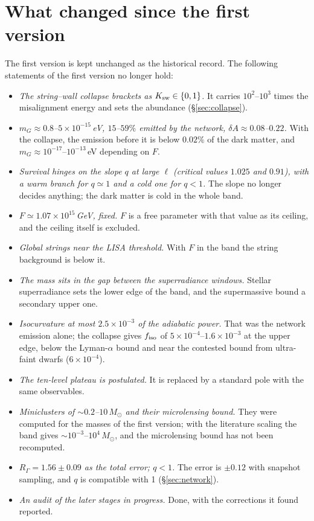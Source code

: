 \documentclass[11pt,a4paper]{article}
\newcommand{\RG}{R_\Gamma}
\newcommand{\dA}{\delta A}
\begin{document}
\section{What changed since the first version}
\label{sec:changes}

The first version is kept unchanged as the historical record.
The following statements of the first version no longer hold:
\begin{itemize}
\item \emph{The string--wall collapse brackets as $K_{\rm sw}\in\{0,1\}$.} It carries $10^2$--$10^3$ times the misalignment energy and sets the abundance (\S\ref{sec:collapse}).
\item \emph{$m_G\approx0.8$--$5\times10^{-15}$\,eV, $15$--$59\%$ emitted by the network, $\dA\approx0.08$--$0.22$.} With the collapse, the emission before it is below $0.02\%$ of the dark matter, and $m_G\approx10^{-17}$--$10^{-13}$\,eV depending on $F$.
\item \emph{Survival hinges on the slope $q$ at large $\ell$ (critical values $1.025$ and $0.91$), with a warm branch for $q\simeq1$ and a cold one for $q<1$.} The slope no longer decides anything; the dark matter is cold in the whole band.
\item \emph{$F\simeq1.07\times10^{15}$\,GeV, fixed.} $F$ is a free parameter with that value as its ceiling, and the ceiling itself is excluded.
\item \emph{Global strings near the LISA threshold.} With $F$ in the band the string background is below it.
\item \emph{The mass sits in the gap between the superradiance windows.} Stellar superradiance sets the lower edge of the band, and the supermassive bound a secondary upper one.
\item \emph{Isocurvature at most $2.5\times10^{-3}$ of the adiabatic power.} That was the network emission alone; the collapse gives $f_{\rm iso}$ of $5\times10^{-4}$--$1.6\times10^{-3}$ at the upper edge, below the Lyman-$\alpha$ bound and near the contested bound from ultra-faint dwarfs ($6\times10^{-4}$).
\item \emph{The ten-level plateau is postulated.} It is replaced by a standard pole with the same observables.
\item \emph{Miniclusters of $\sim0.2$--$10\,M_\odot$ and their microlensing bound.} They were computed for the masses of the first version; with the literature scaling the band gives $\sim10^{-3}$--$10^4\,M_\odot$, and the microlensing bound has not been recomputed.
\item \emph{$\RG=1.56\pm0.09$ as the total error; $q<1$.} The error is $\pm0.12$ with snapshot sampling, and $q$ is compatible with 1 (\S\ref{sec:network}).
\item \emph{An audit of the later stages in progress.} Done, with the corrections it found reported.
\end{itemize}
\end{document}
